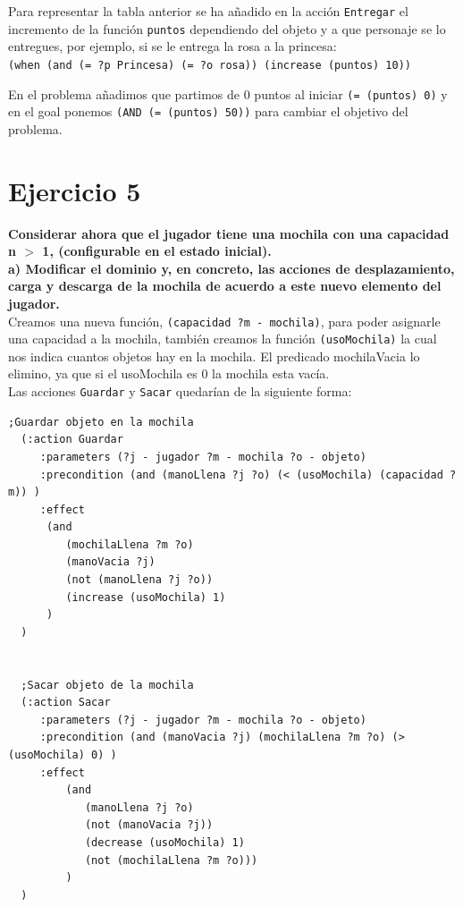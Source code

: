 \documentclass[12pt]{article}
\begin{document}
Para representar la tabla anterior se ha añadido en la acción \texttt{Entregar} el incremento de la función \texttt{puntos} dependiendo del objeto y a que personaje se lo entregues, por ejemplo, si se le entrega la rosa a la princesa: \\
\texttt{(when (and (= ?p Princesa) (= ?o rosa)) (increase (puntos) 10))}

En el problema añadimos que partimos de 0 puntos al iniciar \texttt{(= (puntos) 0)} y en el goal ponemos \texttt{(AND (= (puntos) 50))} para cambiar el objetivo del problema.

\section{Ejercicio 5}\textbf{Considerar ahora que el jugador tiene una mochila con una capacidad n $>$ 1, (configurable en el estado inicial).}\\

\textbf{a) Modificar el dominio y, en concreto, las acciones de desplazamiento, carga y
descarga de la mochila de acuerdo a este nuevo elemento del jugador.}\\

Creamos una nueva función, \texttt{(capacidad ?m - mochila)}, para poder asignarle una capacidad a la mochila, también creamos la función \texttt{(usoMochila)} la cual nos indica cuantos objetos hay en la mochila. El predicado mochilaVacia lo elimino, ya que si el usoMochila es 0 la mochila esta vacía.\\

Las acciones \texttt{Guardar} y \texttt{Sacar} quedarían de la siguiente forma:

\begin{verbatim}
;Guardar objeto en la mochila
  (:action Guardar
     :parameters (?j - jugador ?m - mochila ?o - objeto)
     :precondition (and (manoLlena ?j ?o) (< (usoMochila) (capacidad ?m)) )
     :effect
      (and
         (mochilaLlena ?m ?o)
         (manoVacia ?j)
         (not (manoLlena ?j ?o))
         (increase (usoMochila) 1)
      )
  )


  ;Sacar objeto de la mochila
  (:action Sacar
     :parameters (?j - jugador ?m - mochila ?o - objeto)
     :precondition (and (manoVacia ?j) (mochilaLlena ?m ?o) (> (usoMochila) 0) )
     :effect
         (and
            (manoLlena ?j ?o)
            (not (manoVacia ?j))
            (decrease (usoMochila) 1)
            (not (mochilaLlena ?m ?o)))
         )
  )
\end{verbatim}
\end{document}
